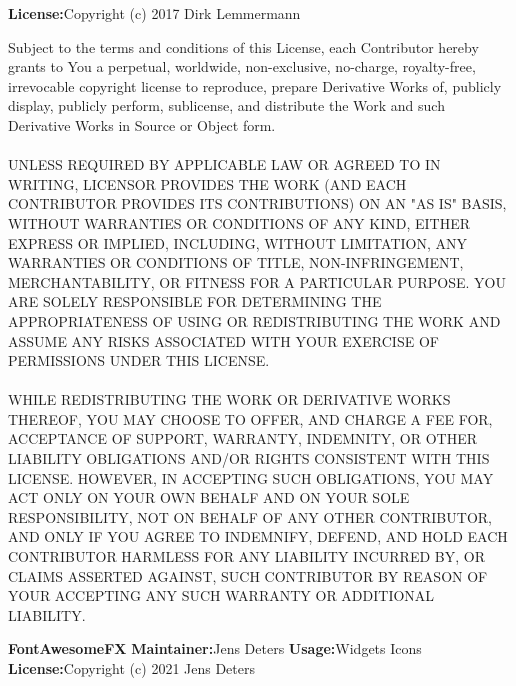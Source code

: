 \newline
\newline
{\bfseries License:}{\space Copyright (c) 2017 Dirk Lemmermann}
\newline
\begin{addmargin}[4.5em]{0em}
    \fontsize{10pt}{12pt}\selectfont
    Subject to the terms and conditions of this License, each Contributor hereby grants to
    You a perpetual, worldwide, non-exclusive, no-charge, royalty-free, irrevocable copyright
    license to reproduce, prepare Derivative Works of, publicly display, publicly perform,
    sublicense, and distribute the Work and such Derivative Works in Source or Object form.
    \\ \\
    \uppercase{Unless required by applicable law or agreed to in writing,
    Licensor provides the Work (and each Contributor provides its Contributions)
    on an "AS IS" BASIS, WITHOUT WARRANTIES OR CONDITIONS OF ANY KIND, either express
    or implied, including, without limitation, any warranties or conditions of TITLE,
    NON-INFRINGEMENT, MERCHANTABILITY, or FITNESS FOR A PARTICULAR PURPOSE. You are
    solely responsible for determining the appropriateness of using or redistributing
    the Work and assume any risks associated with Your exercise of permissions under
    this License.
    \\ \\
    While redistributing the Work or Derivative Works thereof, You may choose to offer,
    and charge a fee for, acceptance of support, warranty, indemnity, or other liability
    obligations and/or rights consistent with this License. However, in accepting such
    obligations, You may act only on Your own behalf and on Your sole responsibility,
    not on behalf of any other Contributor, and only if You agree to indemnify, defend,
    and hold each Contributor harmless for any liability incurred by, or claims asserted
    against, such Contributor by reason of your accepting any such warranty or additional
    liability.}
\end{addmargin}
\newpage
{\bfseries FontAwesomeFX}
\newline
\newline
{\bfseries Maintainer:}{\space Jens Deters}
\newline
\newline
{\bfseries Usage:}{\space Widgets Icons}
\newline
\newline
{\bfseries License:}{\space Copyright (c) 2021 Jens Deters}
